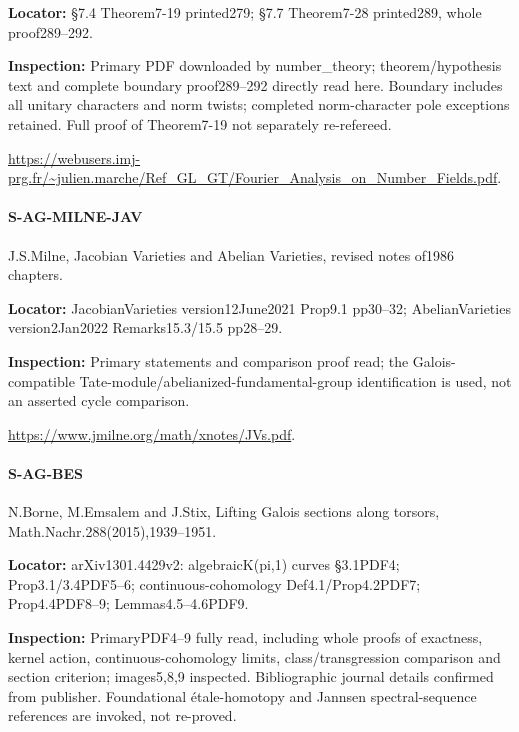 \documentclass[11pt,a4paper]{article}
\begin{document}
\textbf{Locator:} §7.\allowbreak{}4 Theorem7-19 printed279; §7.\allowbreak{}7 Theorem7-28 printed289, whole proof289–\allowbreak{}292.

\textbf{Inspection:} Primary PDF downloaded by number\_\allowbreak{}theory; theorem/\allowbreak{}hypothesis text and complete boundary proof289–\allowbreak{}292 directly read here.\allowbreak{} Boundary includes all unitary characters and norm twists; completed norm-character pole exceptions retained.\allowbreak{} Full proof of Theorem7-19 not separately re-refereed.\allowbreak{}

\url{https://webusers.imj-prg.fr/~julien.marche/Ref_GL_GT/Fourier_Analysis_on_Number_Fields.pdf}.

\paragraph{S-AG-MILNE-JAV} J.\allowbreak{}S.\allowbreak{}Milne, Jacobian Varieties and Abelian Varieties, revised notes of1986 chapters.

\textbf{Locator:} JacobianVarieties version12June2021 Prop9.\allowbreak{}1 pp30–\allowbreak{}32; AbelianVarieties version2Jan2022 Remarks15.\allowbreak{}3/\allowbreak{}15.\allowbreak{}5 pp28–\allowbreak{}29.

\textbf{Inspection:} Primary statements and comparison proof read; the Galois-compatible Tate-module/\allowbreak{}abelianized-fundamental-group identification is used, not an asserted cycle comparison.\allowbreak{}

\url{https://www.jmilne.org/math/xnotes/JVs.pdf}.

\paragraph{S-AG-BES} N.\allowbreak{}Borne, M.\allowbreak{}Emsalem and J.\allowbreak{}Stix, Lifting Galois sections along torsors, Math.\allowbreak{}Nachr.\allowbreak{}288(2015),1939–\allowbreak{}1951.

\textbf{Locator:} arXiv1301.\allowbreak{}4429v2:\allowbreak{} algebraicK(pi,1) curves §3.\allowbreak{}1PDF4; Prop3.\allowbreak{}1/\allowbreak{}3.\allowbreak{}4PDF5–\allowbreak{}6; continuous-cohomology Def4.\allowbreak{}1/\allowbreak{}Prop4.\allowbreak{}2PDF7; Prop4.\allowbreak{}4PDF8–\allowbreak{}9; Lemmas4.\allowbreak{}5–\allowbreak{}4.\allowbreak{}6PDF9.

\textbf{Inspection:} PrimaryPDF4–\allowbreak{}9 fully read, including whole proofs of exactness, kernel action, continuous-cohomology limits, class/\allowbreak{}transgression comparison and section criterion; images5,8,9 inspected.\allowbreak{} Bibliographic journal details confirmed from publisher.\allowbreak{} Foundational étale-homotopy and Jannsen spectral-sequence references are invoked, not re-proved.\allowbreak{}
\end{document}
